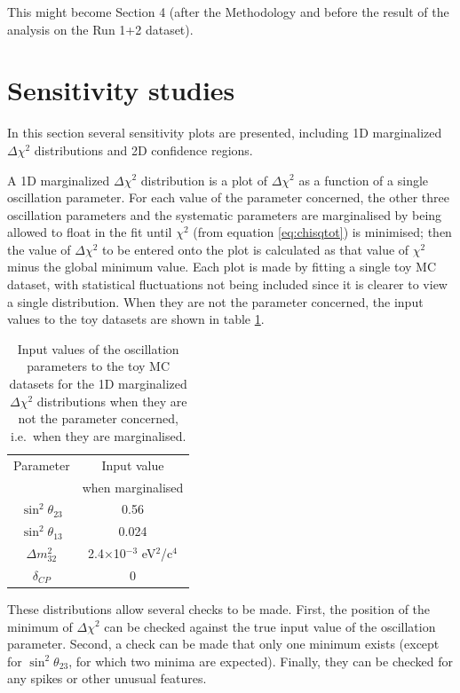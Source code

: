\clearpage

{\color{red} This might become Section 4 (after the Methodology and before the result of the analysis on the Run 1+2 dataset). }

\section{Sensitivity studies}

In this section several sensitivity plots are presented, including 1D marginalized $\Delta\chi^{2}$ distributions and 2D confidence regions.

A 1D marginalized $\Delta\chi^{2}$ distribution is a plot of $\Delta\chi^{2}$ as a function of a single oscillation parameter. For each value 
of the parameter concerned, the other three oscillation parameters and the systematic parameters are marginalised by being allowed to float in 
the fit until $\chi^{2}$ (from equation \ref{eq:chisqtot}) is minimised; then the value of $\Delta\chi^{2}$ to be entered onto the plot is 
calculated as that value of $\chi^{2}$ minus the global minimum value. Each plot is made by fitting a single toy MC dataset, with statistical 
fluctuations not being included since it is clearer to view a single distribution. When they are not the parameter concerned, the input values 
to the toy datasets are shown in table \ref{tab:inputvalues}. 
\begin{table}[h]
\centering
\begin{tabular}{|c|c|}
\hline
 Parameter & Input value \\
  & when marginalised \\
\hline \hline
$\sin^{2}\theta_{23}$ & 0.56 \\
$\sin^{2}\theta_{13}$ & 0.024 \\
$\Delta m_{32}^{2}$ & 2.4$\times$10$^{-3}$ eV$^{2}$/c$^{4}$\\
$\delta_{CP}$ & 0 \\
\hline
\end{tabular}
\caption{Input values of the oscillation parameters to the toy MC datasets for the 1D marginalized $\Delta\chi^{2}$ distributions when they are not 
         the parameter concerned, i.e.\ when they are marginalised.}
\label{tab:inputvalues}
\end{table}

These distributions allow several checks to be made. First, the position of the minimum of $\Delta\chi^{2}$ can be checked against the true 
input value of the oscillation parameter. Second, a check can be made that only one minimum exists (except for $\sin^{2}\theta_{23}$, for 
which two minima are expected). Finally, they can be checked for any spikes or other unusual features. 

